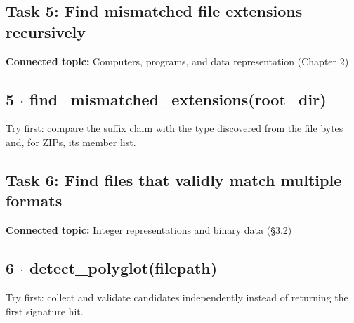 \documentclass[11pt]{article}
\begin{document}
\begin{keepsection}
\section{Task 5: Find mismatched file extensions recursively}

\textbf{Connected topic:} Computers, programs, and data representation (Chapter 2)

\begin{keepsection}
\subsection{5 \ensuremath{\cdot} find\_mismatched\_extensions(root\_dir)}

Try first: compare the suffix claim with the type discovered from the file bytes and, for ZIPs, its member list.

\end{keepsection}
\end{keepsection}

\begin{keepsection}
\section{Task 6: Find files that validly match multiple formats}

\textbf{Connected topic:} Integer representations and binary data (§3.2)

\begin{keepsection}
\subsection{6 \ensuremath{\cdot} detect\_polyglot(filepath)}

Try first: collect and validate candidates independently instead of returning the first signature hit.

\end{keepsection}
\end{keepsection}
\end{document}
